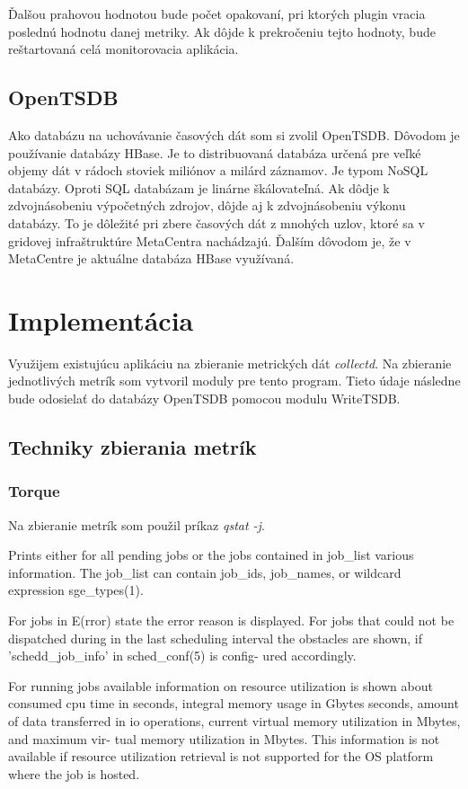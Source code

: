 \documentclass[11pt,final,oneside]{fithesis}
\begin{document}
Ďalšou prahovou hodnotou bude počet opakovaní, pri ktorých plugin vracia poslednú hodnotu danej metriky. Ak dôjde k prekročeniu tejto hodnoty, bude reštartovaná celá monitorovacia aplikácia.

\section{OpenTSDB}
Ako databázu na uchovávanie časových dát som si zvolil OpenTSDB. Dôvodom je používanie databázy HBase. Je to distribuovaná databáza určená pre veľké objemy dát v rádoch stoviek miliónov a milárd záznamov. 
Je typom NoSQL databázy. Oproti SQL databázam je linárne škálovateľná. Ak dôdje k zdvojnásobeniu výpočetných zdrojov, dôjde aj k zdvojnásobeniu výkonu databázy. To je dôležité pri zbere časových dát z mnohých uzlov,
ktoré sa v gridovej infraštruktúre MetaCentra nachádzajú. Ďalším dôvodom je, že v MetaCentre je aktuálne databáza HBase využívaná.


\chapter{Implementácia}
Využijem existujúcu aplikáciu na zbieranie metrických dát \emph{collectd}. Na zbieranie jednotlivých metrík som vytvoril moduly pre tento program. Tieto údaje následne bude odosielať do databázy OpenTSDB
pomocou modulu WriteTSDB.

\section{Techniky zbierania metrík}
\subsection{Torque}
Na zbieranie metrík som použil príkaz \emph{qstat -j}.

			Prints either for all pending jobs  or  the  jobs  contained  in  job\_list  various information. The job\_list
          can contain job\_ids, job\_names, or wildcard  expression
          sge\_types(1).

          For  jobs  in  E(rror)  state  the  error   reason   is
          displayed. For jobs that could not be dispatched during
          in the  last  scheduling  interval  the  obstacles  are
          shown, if 'schedd\_job\_info' in sched\_conf(5) is config-
          ured accordingly.

          For running  jobs  available  information  on  resource
          utilization   is  shown  about  consumed  cpu  time  in
          seconds,  integral  memory  usage  in  Gbytes  seconds,
          amount  of  data  transferred in io operations, current
          virtual memory utilization in Mbytes, and maximum  vir-
          tual  memory utilization in Mbytes. This information is
          not available if resource utilization retrieval is  not
          supported for the OS platform where the job is hosted.
          
\end{document}
